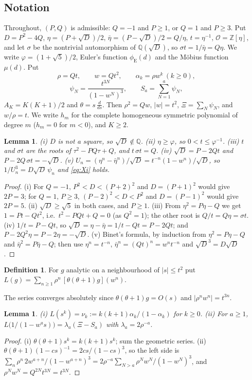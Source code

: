 \documentclass[11pt]{amsart}
\newtheorem{lemma}[theorem]{Lemma}
\theoremstyle{definition}
\newtheorem{definition}[theorem]{Definition}
\theoremstyle{remark}
\numberwithin{equation}{section}
\newcommand{\ZZ}{\mathbb{Z}}
\newcommand{\QQ}{\mathbb{Q}}
\newcommand{\cO}{\mathcal{O}}
\newcommand{\eu}{\phi_{\mathrm E}}
\begin{document}
\subsection*{Notation}
Throughout, $(P,Q)$ is admissible: $Q=-1$ and $P\ge1$, or $Q=1$ and $P\ge3$. Put $D=P^2-4Q$, $\eta=(P+\sqrt D)/2$,
$\bar\eta=(P-\sqrt D)/2=Q/\eta$, $t=\eta^{-1}$, $\cO=\ZZ[\eta]$, and let $\sigma$ be the nontrivial automorphism of
$\QQ(\sqrt D)$, so $\sigma t=1/\bar\eta=Q\eta$. We write $\varphi=(1+\sqrt5)/2$, Euler's function $\eu(d)$ and the
M\"obius function $\mu(d)$. Put
\[
\rho=Qt,\qquad w=Qt^2,\qquad \alpha_k=\rho w^k\ (k\ge0),
\]
\[
\psi_N=\frac{t^{3N}}{(1-w^N)^3},\qquad S_a=\sum_{N=1}^a\psi_N,
\]
$A_K=K(K+1)/2$ and $\theta=s\,\frac{d}{ds}$. Then $\rho^2=Qw$, $|w|=t^2$, $\Xi=\sum_N\psi_N$, and $w/\rho=t$. We write
$h_m$ for the complete homogeneous symmetric polynomial of degree $m$ ($h_m=0$ for $m<0$), and $K\ge2$.

\begin{lemma}\label{lem:unit}
\textup{(i)} $D$ is not a square, so $\sqrt D\notin\QQ$. \textup{(ii)} $\eta\ge\varphi$, so $0<t\le\varphi^{-1}$.
\textup{(iii)} $t$ and $\sigma t$ are the roots of $\tau^2-PQ\tau+Q$, and $t\,\sigma t=Q$.
\textup{(iv)} $\sqrt D=P-2Qt$ and $P-2Q\,\sigma t=-\sqrt D$.
\textup{(v)} $U_n=(\eta^n-\bar\eta^n)/\sqrt D=t^{-n}(1-w^n)/\sqrt D$, so $1/U_n^3=D\sqrt D\,\psi_n$ and \eqref{eq:Xi}
holds.
\end{lemma}
\begin{proof}
(i) For $Q=-1$, $P^2<D<(P+2)^2$ and $D=(P+1)^2$ would give $2P=3$; for $Q=1$, $P\ge3$, $(P-2)^2<D<P^2$ and
$D=(P-1)^2$ would give $2P=5$. (ii) $\sqrt D\ge\sqrt5$ in both cases, and $P\ge1$. (iii) From $\eta^2=P\eta-Q$ we get
$1=Pt-Qt^2$, i.e.\ $t^2-PQt+Q=0$ (as $Q^2=1$); the other root is $Q/t=Q\eta=\sigma t$. (iv) $1/t=P-Qt$, so
$\sqrt D=\eta-\bar\eta=1/t-Qt=P-2Qt$; and $P-2Q^2\eta=P-2\eta=-\sqrt D$. (v) Binet's formula, by induction from
$\eta^2=P\eta-Q$ and $\bar\eta^2=P\bar\eta-Q$; then use $\eta^n=t^{-n}$, $\bar\eta^n=(Qt)^n=w^nt^{-n}$ and
$\sqrt D^3=D\sqrt D$.
\end{proof}

\begin{definition}
For $g$ analytic on a neighbourhood of $|s|\le t^2$ put
$\displaystyle L(g)=\sum_{n\ge1}\rho^n\,[\theta(\theta+1)g](w^n)$.
\end{definition}
The series converges absolutely since $\theta(\theta+1)g=O(s)$ and $|\rho^nw^n|=t^{3n}$.

\begin{lemma}\label{lem:moments}
\textup{(i)} $L(s^k)=\nu_k:=k(k+1)\alpha_k/(1-\alpha_k)$ for $k\ge0$.
\textup{(ii)} For $a\ge1$, $L\bigl(1/(1-w^as)\bigr)=\lambda_a(\Xi-S_a)$ with $\lambda_a=2\rho^{-a}$.
\end{lemma}
\begin{proof}
(i) $\theta(\theta+1)s^k=k(k+1)s^k$; sum the geometric series. (ii) $\theta(\theta+1)(1-cs)^{-1}=2cs/(1-cs)^3$, so the
left side is $\sum_n\rho^n\,2w^{a+n}/(1-w^{a+n})^3=2\rho^{-a}\sum_{N>a}\rho^Nw^N/(1-w^N)^3$, and
$\rho^Nw^N=Q^{2N}t^{3N}=t^{3N}$.
\end{proof}
\end{document}
